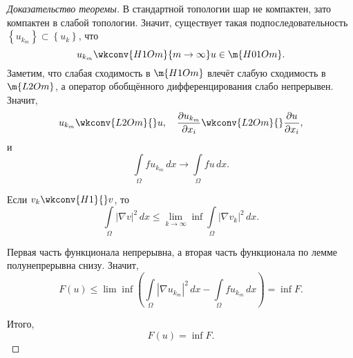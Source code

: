 \begin{proof}[Доказательство теоремы]
В стандартной топологии шар не компактен, зато компактен в слабой топологии. Значит, существует такая подпоследовательность $\left\{ u_{k_m} \right\} \subset \left\{ u_k \right\}$, что 
$$u_{k_m} \wkconv{H1Om}{m \to \infty} u \in \m{H01Om}.$$ 
Заметим, что слабая сходимость в $\m{H1Om}$ влечёт слабую сходимость в $\m{L2Om}$, а оператор обобщённого дифференцирования слабо непрерывен. Значит,
$$ u_{k_m} \wkconv{L2Om}{} u, \quad \pder[u_{k_m}]{x_i} \wkconv{L2Om}{} \pder[u]{x_i},$$
и
$$ \int \limits_\Omega f u_{k_m} \, dx \longrightarrow \int \limits_\Omega fu \, dx.$$

\begin{lemma} Если  $v_k \wkconv{H1}{} v$, то 
$$ \int \limits_\Omega | \nabla v| ^2 \, dx \leq \lim_{k \to \infty} \inf \int \limits_\Omega | \nabla v_k|^2 \, dx.$$
\end{lemma}
Первая часть функционала непрерывна, а вторая часть функционала по лемме полунепрерывна снизу. Значит,
$$ F(u) \leq \lim \inf \left( \int \limits_\Omega | \nabla u_{k_m}|^2 \, dx - \int \limits_\Omega f u_{k_m} \, dx \right) = \inf F.$$

Итого,
$$ F(u) = \inf F.$$

\end{proof}













